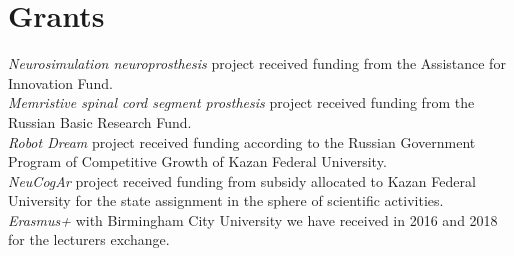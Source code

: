 \documentclass{moderncv}
\begin{document}

    \section{Grants}
    \emph{Neurosimulation neuroprosthesis} project received funding from the Assistance for Innovation Fund. \\
    \emph{Memristive spinal cord segment prosthesis} project received funding from the Russian Basic Research Fund. \\
    \emph{Robot Dream} project received funding according to the Russian Government Program of Competitive Growth of Kazan Federal University. \\
    \emph{NeuCogAr} project received funding from subsidy allocated to Kazan Federal University for the state assignment in the sphere of scientific activities. \\
    \emph{Erasmus+} with Birmingham City University we have received in 2016 and 2018 for the lecturers exchange.

    
\end{document}
